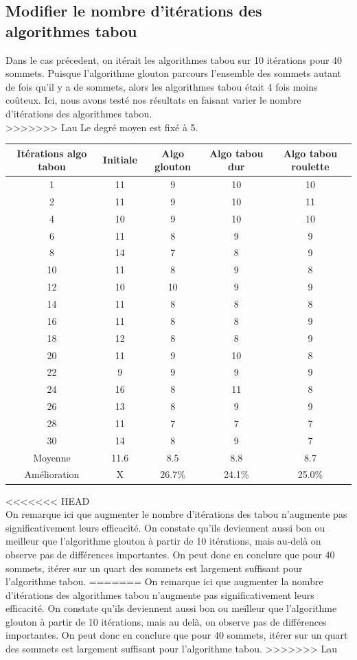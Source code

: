 \documentclass[a4paper,11pt]{article}
\begin{document}
	\subsection{Modifier le nombre d'itérations des algorithmes tabou}
		Dans le cas précedent, on itérait les algorithmes tabou sur 10 itérations pour 40 sommets. Puisque l'algorithme glouton parcours l'ensemble des sommets autant de fois qu'il y a de sommets, alors les algorithmes tabou était 4 fois moins coûteux. Ici, nous avons testé nos résultats en faisant varier le nombre d'itérations des algorithmes tabou.\\
>>>>>>> Lau
		Le degré moyen est fixé à 5.
		\begin{tabular}{|c|c|c|c|c|}
  		\hline
  		Itérations algo tabou & Initiale & Algo glouton & Algo tabou dur & Algo tabou roulette\\
  		\hline
  		1 & 11 & 9 & 10 & 10\\
  		\hline
  		2 & 11 & 9 & 10 & 11\\
  		\hline
  		4 & 10 & 9 & 10 & 10\\
  		\hline
  		6 & 11 & 8 & 9 & 9\\
  		\hline
  		8 & 14 & 7 & 8 & 9\\
  		\hline
  		10 & 11 & 8 & 9 & 8\\
  		\hline
  		12 & 10 & 10 & 9 & 9\\
  		\hline
  		14 & 11 & 8 & 8 & 8\\
  		\hline
  		16 & 11 & 8 & 8 & 9\\
  		\hline
  		18 & 12 & 8 & 8 & 9\\
  		\hline
  		20 & 11 & 9 & 10 & 8\\
  		\hline
  		22 & 9 & 9 & 9 & 9\\
  		\hline
  		24 & 16 & 8 & 11 & 8\\
  		\hline
  		26 & 13 & 8 & 9 & 9\\
  		\hline
  		28 & 11 & 7 & 7 & 7\\
  		\hline
  		30 & 14 & 8 & 9 & 7\\
  		\hline
  		Moyenne & 11.6 & 8.5 & 8.8 & 8.7\\
  		\hline
  		Amélioration & X & 26.7\% & 24.1\% & 25.0\%\\
  		\hline
	\end{tabular}
<<<<<<< HEAD
	\\
	On remarque ici que augmenter le nombre d'itérations des tabou n'augmente pas significativement leurs efficacité. On constate qu'ils deviennent aussi bon ou meilleur que l'algorithme glouton à partir de 10 itérations, mais au-delà on observe pas de différences importantes. On peut donc en conclure que pour 40 sommets, itérer sur un quart des sommets est largement suffisant pour l'algorithme tabou.
=======
	On remarque ici que augmenter la nombre d'itérations des algorithmes tabou n'augmente pas significativement leurs efficacité. On constate qu'ils deviennent aussi bon ou meilleur que l'algorithme glouton à partir de 10 itérations, mais au delà, on observe pas de différences importantes. On peut donc en conclure que pour 40 sommets, itérer sur un quart des sommets est largement suffisant pour l'algorithme tabou.
>>>>>>> Lau
\end{document}
